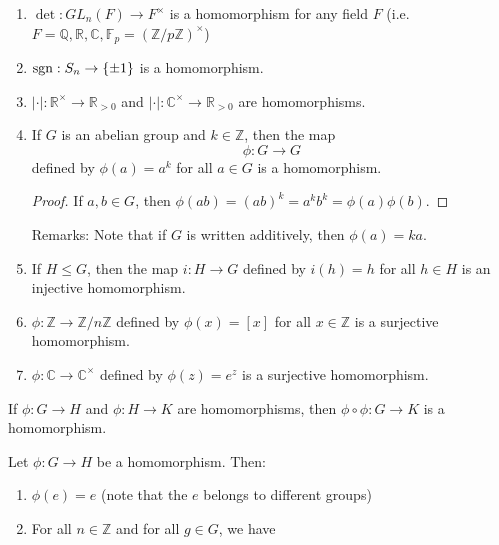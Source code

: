 \begin{itemize}
\begin{enumerate}
              \item $\det: GL_n(F) \rightarrow F^\times$ is a homomorphism for any field $F$ (i.e. $F=\mathbb{Q}, \mathbb{R}, \mathbb{C}, \mathbb{F}_p = \left(\mathbb{Z}/p\mathbb{Z}\right)^\times$)
              \item $\operatorname{sgn}: S_n \rightarrow \{\pm 1\}$ is a homomorphism.
              \item $|\cdot|: \mathbb{R}^\times \rightarrow \mathbb{R}_{>0}$ and $|\cdot|: \mathbb{C}^\times \rightarrow \mathbb{R}_{>0}$ are homomorphisms.
              \item If $G$ is an abelian group and $k\in \mathbb{Z}$, then the map
                    \begin{equation}
                        \phi:G\rightarrow G
                    \end{equation}
                    defined by $\phi(a)=a^k$ for all $a\in G$ is a homomorphism.
                    \begin{proof}
                        If $a,b\in G$, then $\phi(ab)=(ab)^k=a^kb^k = \phi(a)\phi(b)$.
                    \end{proof}
                    Remarks: Note that if $G$ is written additively, then $\phi(a)=ka$.
              \item If $H \le G$, then the map $i:H\rightarrow G$ defined by $i(h)=h$ for all $h\in H$ is an injective homomorphism.
              \item $\phi:\mathbb{Z} \rightarrow \mathbb{Z}/n\mathbb{Z}$ defined by $\phi(x) = [x]$ for all $x\in \mathbb{Z}$ is a surjective homomorphism.
              \item $\phi:\mathbb{C}\rightarrow \mathbb{C}^\times$ defined by $\phi(z)=e^z$ is a surjective homomorphism.
          \end{enumerate}
          \begin{proposition}
              If $\phi:G\rightarrow H$ and $\phi:H\rightarrow K$ are homomorphisms, then $\phi \circ \phi:G\rightarrow K$ is a homomorphism.
          \end{proposition}
          \begin{proposition}
              Let $\phi:G\rightarrow H$ be a homomorphism. Then:
              \begin{enumerate}
                  \item $\phi(e)=e$ (note that the $e$ belongs to different groups)
                  \item For all $n\in \mathbb{Z}$ and for all $g\in G$, we have
                        \begin{equation}

\end{equation}
\end{enumerate}
\end{proposition}
\end{itemize}
